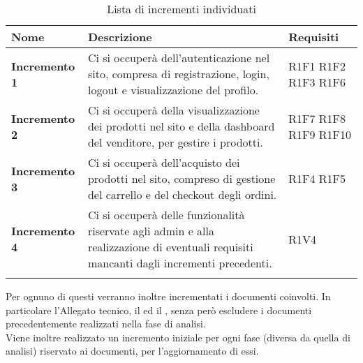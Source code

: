{


\centering
\renewcommand{\arraystretch}{1.8}
\begin{longtable}{C{3cm} C{8cm} C{3cm} }

\textbf{Nome} &
\textbf{Descrizione}&
\textbf{Requisiti}\\
\endhead

\textbf{Incremento 1} & Ci si occuperà dell'autenticazione nel sito, compresa di registrazione, login, logout e visualizzazione del profilo. & R1F1 \newline R1F2 \newline R1F3 \newline R1F6 \\
\textbf{Incremento 2} & Ci si occuperà della visualizzazione dei prodotti nel sito e della dashboard del venditore, per gestire i prodotti. & R1F7 \newline R1F8 \newline R1F9 \newline R1F10 \\
\textbf{Incremento 3} & Ci si occuperà dell'acquisto dei prodotti nel sito, compreso di gestione del carrello e del checkout degli ordini. & R1F4 \newline R1F5 \\
\textbf{Incremento 4} & Ci si occuperà delle funzionalità riservate agli admin e alla realizzazione di eventuali requisiti mancanti dagli incrementi precedenti. & R1V4 \\

\caption{Lista di incrementi individuati}

\end{longtable}
}

Per ognuno di questi verranno inoltre incrementati i documenti coinvolti. In particolare l'Allegato tecnico, il \MU{} ed il \MM{}, senza però escludere i documenti precedentemente realizzati nella fase di analisi.\\
Viene inoltre realizzato un incremento iniziale per ogni fase (diversa da quella di analisi) riservato ai documenti, per l'aggiornamento di essi.
